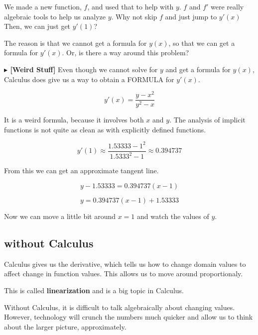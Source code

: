 \documentclass{ximera}
\begin{document}
We made a new function, $f$, and used that to help with $y$.  $f$ and $f'$ were really algebraic tools to help us analyze $y$. Why not skip $f$ and just jump to $y'(x)$  Then, we can just get $y'(1)$?

The reason is that we cannot get a formula for $y(x)$, so that we can get a formula for $y'(x)$. Or, is there a way around this problem?



\textbf{\textcolor{red!70!black}{$\blacktriangleright$  [Weird Stuff]}}  Even though we cannot solve for $y$ and get a formula for $y(x)$, Calculus does give us a way to obtain a FORMULA for $y'(x)$.



\[
y'(x) = \frac{y - x^2}{y^2 - x}
\]


It is a weird formula, because it involves both $x$ and $y$.  The analysis of implicit functions is not quite as clean as with explicitly defined functions.


\[
y'(1) \approx \frac{1.53333 - 1^2}{1.5333^2 - 1} \approx 0.394737
\]



From this we can get an approximate tangent line.

\[
y - 1.53333 = 0.394737(x-1)
\]


\[
y = 0.394737(x-1) + 1.53333
\]


Now we can move a little bit around $x=1$ and watch the values of $y$.



\begin{center}
\end{center}






\subsection*{without Calculus}



Calculus gives us the derivative, which tells us how to change domain values to affect change in function values.  This allows us to move around proportionaly.  

This is called \textbf{linearization} and is a big topic in Calculus.

Without Calculus, it is difficult to talk algebraically about changing values.  However, technology will crunch the numbers much quicker and allow us to think about the larger picture, approximately.
\end{document}
